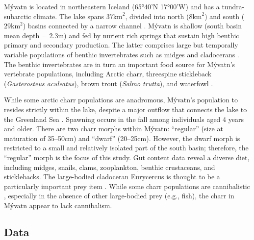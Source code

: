 \documentclass[11pt]{article}
\begin{document}
M\'{y}vatn is located in northeastern Iceland (65°40’N 17°00’W) 
and has a tundra-subarctic climate. 
The lake spans $37 \text{km}^2$, 
divided into north ($8 \text{km}^2$) and south ($29 \text{km}^2$) basins 
connected by a narrow channel \citep{einarsson2004myvatn}. 
M\'{y}vatn is shallow (south basin mean depth = 2.3m) and 
fed by nurient rich springs that sustain high benthic primary and secondary production.
The latter comprises large but temporally variable populations of benthic invertebrates 
such as midges and cladocerans \citep{einarsson2004clad, gardarsson2004population}.
The benthic invertebrates are in turn 
an important food source for M\'{y}vatn’s vertebrate populations, 
including Arctic charr, threespine stickleback (\emph{Gasterosteus aculeatus}), 
brown trout (\emph{Salmo trutta}), and waterfowl \citep{einarsson2004myvatn}. 

While some arctic charr populations are anadromous, 
M\'{y}vatn’s population to resides strictly within the lake, 
despite a major outflow that connects the lake to the Greenland Sea \citep{gudbergsson2004}. 
Spawning occurs in the fall among individuals aged 4 years and older. 
There are two charr morphs within M\'{y}vatn: ``regular'' (size at maturation of 35--50cm) 
and ``dwarf'' (20--25cm). However, the dwarf morph is restricted to a small 
and relatively isolated part of the south basin; therefore, 
the ``regular'' morph is the focus of this study. 
Gut content data reveal a diverse diet, including midges, snails, clams, zooplankton, 
benthic crustaceans, and sticklebacks. 
The large-bodied cladoceran Eurycercus is thought to be a particularly important prey item 
\citep{gudbergsson2004}. 
While some charr populations are cannibalistic \citep{klemetsen2003atlantic}, 
especially in the absence of other large-bodied prey (e.g., fish), 
the charr in M\'{y}vatn appear to lack cannibalism. 

\subsection*{Data} 
\end{document}
